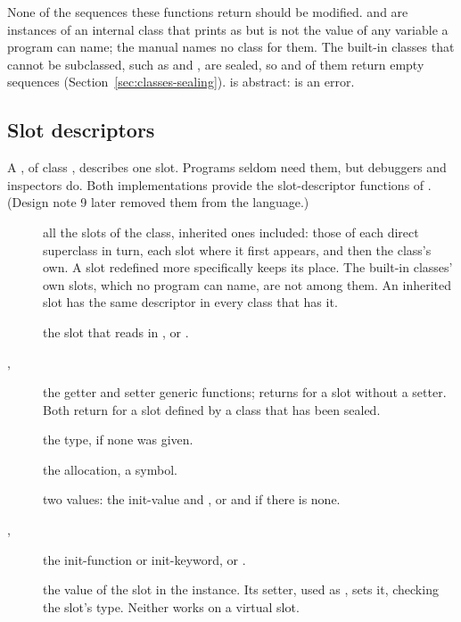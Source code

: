 \noindent None of the sequences these functions return should be modified.
 and  are instances of an internal class that prints
as  but is not the value of any variable a
program can name; the manual names no class for them. The built-in
classes that cannot be subclassed, such as  and
, are sealed, so  and
 of them return empty sequences
(Section~\ref{sec:classes-sealing}).  is abstract:
 is an error.

\subsection{Slot descriptors}\label{sec:classes-slot-descriptors}

A , of class , describes one
slot. Programs seldom need them, but debuggers and inspectors do. Both
implementations provide the slot-descriptor functions of
. (Design note 9 later removed them from the
language.)

\begin{description}
\item[] all the slots of the class,
  inherited ones included: those of each direct superclass in turn, each
  slot where it first appears, and then the class's own. A slot redefined
  more specifically keeps its place. The built-in classes' own slots,
  which no program can name, are not among them. An inherited slot has
  the same descriptor in every class that has it.
\item[] the slot that
   reads in , or .
\item[, ] the
  getter and setter generic functions;  returns
   for a slot without a setter. Both return  for a
  slot defined by a class that has been sealed.
\item[] the type,  if none was
  given.
\item[] the allocation, a symbol.
\item[] two values: the init-value and
  , or  and  if there is none.
\item[, ]
  the init-function or init-keyword, or .
\item[] the value of the slot
  in the instance. Its setter, used as
  ,
  sets it, checking the slot's type. Neither works on a virtual slot.
\end{description}

